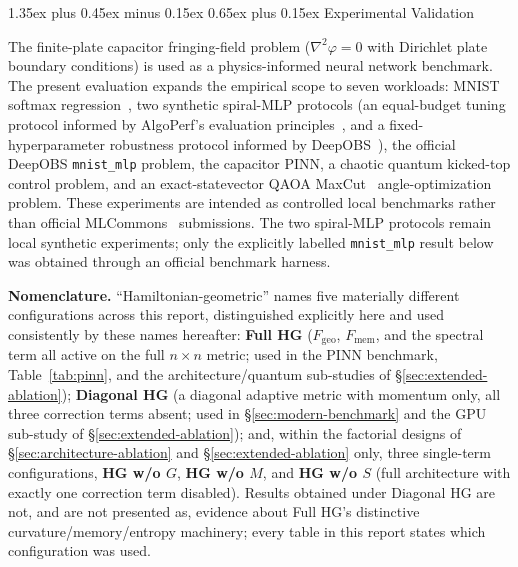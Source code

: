 \documentclass[10pt,twocolumn]{article}
\makeatletter
\renewcommand\section{\@startsection{section}{1}{0pt}%
  {1.35ex plus 0.45ex minus 0.15ex}%
  {0.65ex plus 0.15ex}%
  {\large\bfseries}}
\makeatother
\begin{document}
\section{Experimental Validation}
\label{sec:experimental-validation}

The finite-plate capacitor fringing-field problem
($\nabla^2\varphi = 0$ with Dirichlet plate boundary conditions) is used as a
physics-informed neural network benchmark. The present evaluation expands
the empirical scope to seven workloads: MNIST softmax
regression~\cite{lecun1998mnist}, two synthetic spiral-MLP protocols (an
equal-budget tuning protocol informed by AlgoPerf's evaluation
principles~\cite{dahl2023algoperf}, and a fixed-hyperparameter robustness
protocol informed by DeepOBS~\cite{schneider2019deepobs}), the official
DeepOBS \texttt{mnist\_mlp} problem, the capacitor PINN, a chaotic quantum
kicked-top control problem, and an exact-statevector QAOA
MaxCut~\cite{farhi2014qaoa} angle-optimization problem.
These experiments are intended as controlled local benchmarks rather than
official MLCommons~\cite{dahl2023algoperf} submissions. The two spiral-MLP
protocols remain local synthetic experiments; only the explicitly labelled
\texttt{mnist\_mlp} result below was obtained through an official benchmark
harness.

\textbf{Nomenclature.} ``Hamiltonian-geometric'' names five materially
different configurations across this report, distinguished explicitly here
and used consistently by these names hereafter: \textbf{Full HG} ($F_{\mathrm{geo}}$,
$F_{\mathrm{mem}}$, and the spectral term all active on the full $n\times n$
metric; used in the PINN benchmark, Table~\ref{tab:pinn}, and the
architecture/quantum sub-studies of \S\ref{sec:extended-ablation});
\textbf{Diagonal HG} (a diagonal adaptive metric with momentum only, all
three correction terms absent; used in \S\ref{sec:modern-benchmark} and the
GPU sub-study of \S\ref{sec:extended-ablation}); and, within the factorial
designs of \S\ref{sec:architecture-ablation} and \S\ref{sec:extended-ablation}
only, three single-term configurations, \textbf{HG w/o $G$}, \textbf{HG w/o
$M$}, and \textbf{HG w/o $S$} (full architecture with exactly one correction
term disabled). Results obtained under Diagonal HG are not, and are not
presented as, evidence about Full HG's distinctive curvature/memory/entropy
machinery; every table in this report states which configuration was used.
\end{document}
